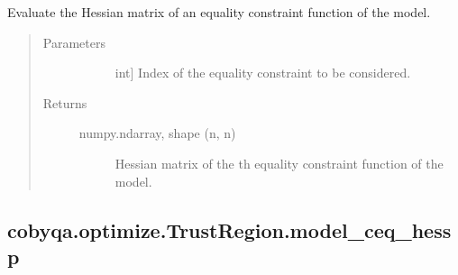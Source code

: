 \documentclass[letterpaper,10pt,english]{sphinxmanual}
\begin{document}
\begin{fulllineitems}
\begin{fulllineitems}
\label{\detokenize{refs/generated/cobyqa.optimize.TrustRegion.model_ceq_hess:cobyqa.optimize.TrustRegion.model_ceq_hess}}
\sphinxAtStartPar
Evaluate the Hessian matrix of an equality constraint function of the
model.
\begin{quote}\begin{description}
\item[{Parameters}] \leavevmode\begin{description}
\item[{}] \leavevmode{[}int{]}
\sphinxAtStartPar
Index of the equality constraint to be considered.

\end{description}

\item[{Returns}] \leavevmode\begin{description}
\item[{numpy.ndarray, shape (n, n)}] \leavevmode
\sphinxAtStartPar
Hessian matrix of the \sphinxhyphen{}th equality constraint function of the
model.

\end{description}

\end{description}\end{quote}

\end{fulllineitems}



\subsection{cobyqa.optimize.TrustRegion.model\_ceq\_hessp}
\label{\detokenize{refs/generated/cobyqa.optimize.TrustRegion.model_ceq_hessp:cobyqa-optimize-trustregion-model-ceq-hessp}}\label{\detokenize{refs/generated/cobyqa.optimize.TrustRegion.model_ceq_hessp::doc}}


\end{fulllineitems}
\end{document}
